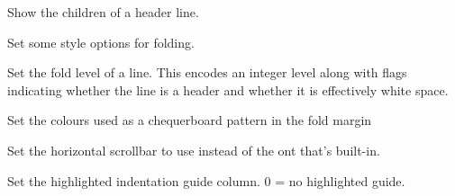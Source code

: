 \label{wxstyledtextctrlsetfoldexpanded}


Show the children of a header line.


\label{wxstyledtextctrlsetfoldflags}


Set some style options for folding.


\label{wxstyledtextctrlsetfoldlevel}


Set the fold level of a line.
This encodes an integer level along with flags indicating whether the
line is a header and whether it is effectively white space.


\label{wxstyledtextctrlsetfoldmargincolour}


Set the colours used as a chequerboard pattern in the fold margin


\label{wxstyledtextctrlsetfoldmarginhicolour}



\label{wxstyledtextctrlsethscrollbar}


Set the horizontal scrollbar to use instead of the ont that's built-in.


\label{wxstyledtextctrlsethighlightguide}


Set the highlighted indentation guide column.
0 = no highlighted guide.


\label{wxstyledtextctrlsethotspotactivebackground}


